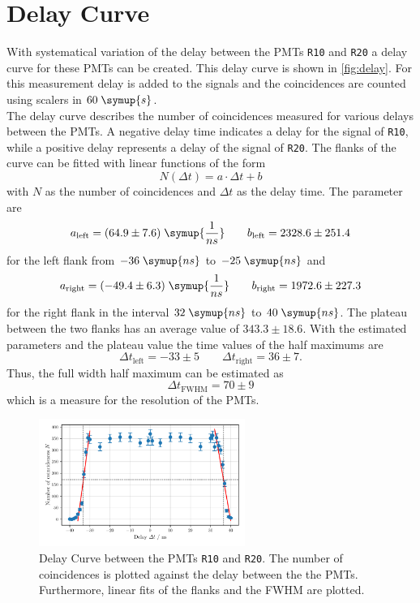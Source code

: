 \section{Delay Curve}
With systematical variation of the delay between the PMTs \texttt{R10} and \texttt{R20} a delay 
curve for these PMTs can be created. This delay curve is shown in \autoref{fig:delay}.
For this measurement delay is added to the signals and the coincidences are counted using scalers in 
$60 \; \symup{s}$. \\
The delay curve describes the number of coincidences measured for various delays between the PMTs.
A negative delay time indicates a delay for the signal of \texttt{R10}, while a positive delay 
represents a delay of the signal of \texttt{R20}. The flanks of the curve can be fitted with linear 
functions of the form 
\begin{equation*}
    N(\Delta t) = a \cdot \Delta t + b
\end{equation*}
with $N$ as the number of coincidences and $\Delta t$ as the delay time. 
The parameter are 
\begin{align*}
    a_{\text{left}} = (64.9 \pm 7.6)\; \symup{\frac{1}{ns}} \qquad
    b_{\text{left}} = 2328.6 \pm 251.4
\end{align*} 
for the left flank from $-36\;\symup{ns}$ to $-25\;\symup{ns}$ and    
\begin{align*}
    a_{\text{right}} = (-49.4 \pm 6.3)\; \symup{\frac{1}{ns}} \qquad
    b_{\text{right}} = 1972.6 \pm 227.3
\end{align*} 
for the right flank in the interval $32\;\symup{ns}$ to $40\;\symup{ns}$.
The plateau between the two flanks has an average value of $343.3 \pm 18.6$. With the estimated 
parameters and the plateau value the time values of the half maximums are 
\begin{equation*}
    \Delta t_{\text{left}} = -33 \pm 5 \qquad
    \Delta t_{\text{right}} = 36 \pm 7.
\end{equation*}
Thus, the full width half maximum can be estimated as 
\begin{equation*}
    \Delta t_{\text{FWHM}} = 70 \pm 9
\end{equation*}
which is a measure for the resolution of the PMTs.
\begin{figure}
    \centering
    \includegraphics[width=0.6\textwidth]{plots/delay.pdf}
    \caption{Delay Curve between the PMTs \texttt{R10} and \texttt{R20}. The number of coincidences is plotted against the delay between the the PMTs.
    Furthermore, linear fits of the flanks and the FWHM are plotted.}
    \label{fig:delay}
\end{figure}
